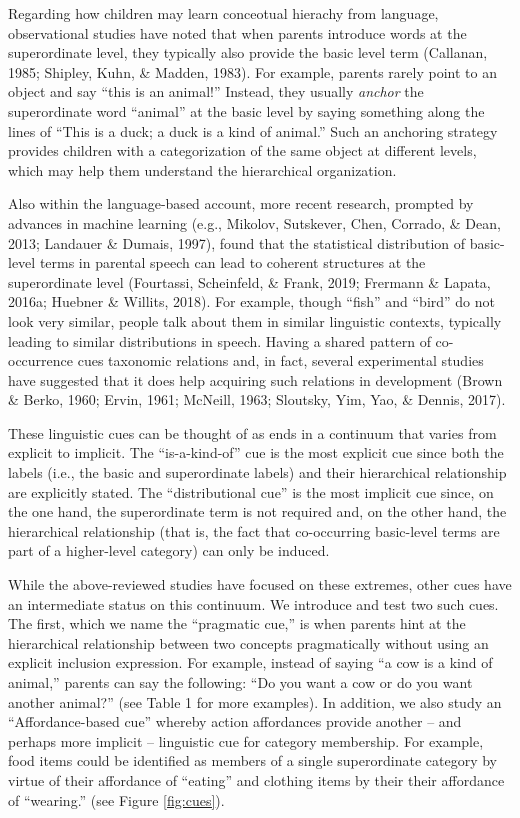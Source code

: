 \documentclass[english,,man]{apa6}
\begin{document}
Regarding how children may learn conceotual hierachy from language, observational studies have noted that when parents introduce words at the superordinate level, they typically also provide the basic level term (Callanan, 1985; Shipley, Kuhn, \& Madden, 1983). For example, parents rarely point to an object and say \enquote{this is an animal!} Instead, they usually \emph{anchor} the superordinate word \enquote{animal} at the basic level by saying something along the lines of \enquote{This is a duck; a duck is a kind of animal.} Such an anchoring strategy provides children with a categorization of the same object at different levels, which may help them understand the hierarchical organization.

Also within the language-based account, more recent research, prompted by advances in machine learning (e.g., Mikolov, Sutskever, Chen, Corrado, \& Dean, 2013; Landauer \& Dumais, 1997), found that the statistical distribution of basic-level terms in parental speech can lead to coherent structures at the superordinate level (Fourtassi, Scheinfeld, \& Frank, 2019; Frermann \& Lapata, 2016a; Huebner \& Willits, 2018). For example, though \enquote{fish} and \enquote{bird} do not look very similar, people talk about them in similar linguistic contexts, typically leading to similar distributions in speech. Having a shared pattern of co-occurrence cues taxonomic relations and, in fact, several experimental studies have suggested that it does help acquiring such relations in development (Brown \& Berko, 1960; Ervin, 1961; McNeill, 1963; Sloutsky, Yim, Yao, \& Dennis, 2017).

These linguistic cues can be thought of as ends in a continuum that varies from explicit to implicit. The \enquote{is-a-kind-of} cue is the most explicit cue since both the labels (i.e., the basic and superordinate labels) and their hierarchical relationship are explicitly stated. The \enquote{distributional cue} is the most implicit cue since, on the one hand, the superordinate term is not required and, on the other hand, the hierarchical relationship (that is, the fact that co-occurring basic-level terms are part of a higher-level category) can only be induced.

While the above-reviewed studies have focused on these extremes, other cues have an intermediate status on this continuum. We introduce and test two such cues. The first, which we name the \enquote{pragmatic cue,} is when parents hint at the hierarchical relationship between two concepts pragmatically without using an explicit inclusion expression. For example, instead of saying \enquote{a cow is a kind of animal,} parents can say the following: \enquote{Do you want a cow or do you want another animal?} (see Table 1 for more examples). In addition, we also study an \enquote{Affordance-based cue} whereby action affordances provide another -- and perhaps more implicit -- linguistic cue for category membership. For example, food items could be identified as members of a single superordinate category by virtue of their affordance of \enquote{eating} and clothing items by their their affordance of \enquote{wearing.} (see Figure \ref{fig:cues}).
\end{document}
